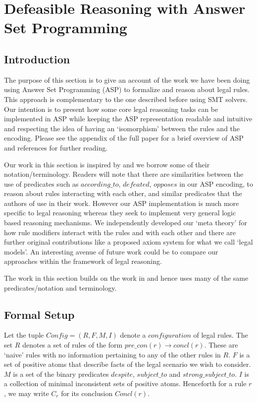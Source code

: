 \section{Defeasible Reasoning with Answer Set Programming}\label{sec:defeasible_asp}



\subsection{Introduction}
The purpose of this section is to give an account of the work we have been
doing using Answer Set Programming (ASP) to formalize and reason about legal
rules. This approach is complementary to the one described before using SMT
solvers. Our intention is to present how some core legal reasoning tasks can
be implemented in ASP while keeping the ASP representation readable and
intuitive and respecting the idea of having an `isomorphism' between the rules
and the encoding. Please see the appendix of the full paper for a brief
overview of ASP and references for further reading. 

Our work in this section is inspired by \cite{DBLP:conf/iclp/WanGKFL09} and we borrow some of their notation/terminology. Readers will note that there are similarities between the use of predicates such as $according\_to$, $defeated$, $opposes$ in our ASP encoding, to reason about rules interacting with each other, and similar predicates that the authors of \cite{DBLP:conf/iclp/WanGKFL09} use in their work. However our ASP implementation is much more specific to legal reasoning whereas they seek to implement very general logic based reasoning mechanisms. We independently developed our `meta theory' for how rule modifiers interact with the rules and with each other and there are further original contributions like a proposed axiom system for what we call `legal models'. An interesting avenue of future work could be to compare our approaches within the framework of legal reasoning.

The work in this section builds on the work in \cite{morris21:_const_answer_set_progr_tool} and hence uses many of the same predicates/notation and terminology. 


\subsection{Formal Setup}
Let the tuple $Config = (R,F,M,I)$ denote a $configuration$ of legal rules. The set $R$ denotes a set of rules of the form $pre\_con(r)\rightarrow concl(r)$. These are `naive' rules with no information pertaining to any of the other rules in $R$. $F$ is a set of positive atoms that describe facts of the legal scenario we wish to consider. $M$ is a set of the binary predicates $despite$, $subject\_to$ and $strong\_subject\_to$. $I$ is a collection of minimal inconsistent sets of positive atoms. Henceforth for a rule $r$, we may write $C_{r}$ for its conclusion $Concl(r)$.

